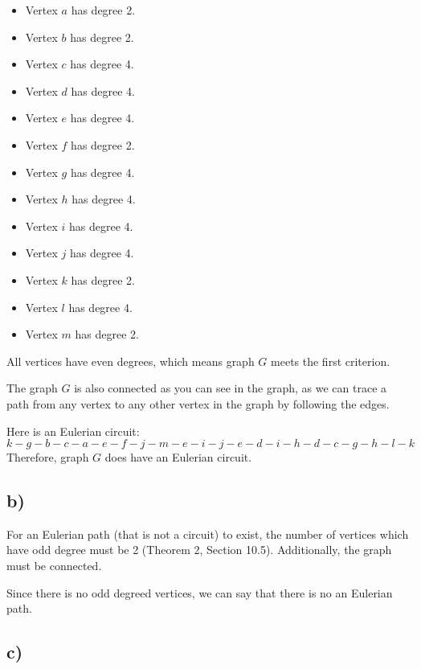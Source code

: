 \documentclass[12pt]{article}
\begin{document}
\begin{itemize}
    \item Vertex \( a \) has degree 2.
    \item Vertex \( b \) has degree 2.
    \item Vertex \( c \) has degree 4.
    \item Vertex \( d \) has degree 4.
    \item Vertex \( e \) has degree 4.
    \item Vertex \( f \) has degree 2.
    \item Vertex \( g \) has degree 4.
    \item Vertex \( h \) has degree 4.
    \item Vertex \( i \) has degree 4.
    \item Vertex \( j \) has degree 4.
    \item Vertex \( k \) has degree 2.
    \item Vertex \( l \) has degree 4.
    \item Vertex \( m \) has degree 2.
\end{itemize}

All vertices have even degrees, which means graph \( G \) meets the first criterion.

The graph \( G \) is also connected as you can see in the graph, as we can trace a path from any vertex to any other vertex in the graph by following the edges.

Here is an Eulerian circuit: \\

\( k-g-b-c-a-e-f-j-m-e-i-j-e-d-i-h-d-c-g-h-l-k \) \\

Therefore, graph \( G \) does have an Eulerian circuit.


\subsection*{b)}

For an Eulerian path (that is not a circuit) to exist, the number of vertices which have odd degree must be 2 (Theorem 2, Section 10.5). Additionally, the graph must be connected.

Since there is no odd degreed vertices, we can say that there is no an Eulerian path.

\subsection*{c)}
\end{document}
